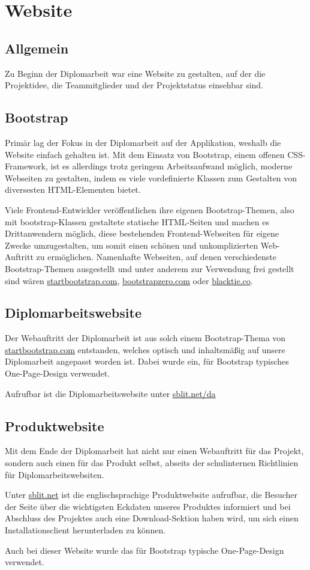 \chapter{Website}
\section{Allgemein}
Zu Beginn der Diplomarbeit war eine Website zu gestalten, auf der die Projektidee,
die Teammitglieder und der Projektstatus einsehbar sind.

\section{Bootstrap}
Primär lag der Fokus in der Diplomarbeit auf der Applikation, weshalb die Website
einfach gehalten ist. Mit dem Einsatz von Bootstrap, einem offenen CSS-Framework,
ist es allerdings trotz geringem Arbeitsaufwand möglich, moderne Webseiten zu gestalten,
indem es viele vordefinierte Klassen zum Gestalten von diversesten HTML-Elementen bietet.

Viele Frontend-Entwickler veröffentlichen ihre eigenen Bootstrap-Themen, also
mit bootstrap-Klassen gestaltete statische HTML-Seiten und machen es Drittanwendern
möglich, diese bestehenden Frontend-Webseiten für eigene Zwecke umzugestalten,
um somit einen schönen und unkomplizierten Web-Auftritt zu ermöglichen. Namenhafte
Webseiten, auf denen verschiedenste Bootstrap-Themen ausgestellt und unter
anderem zur Verwendung frei gestellt sind wären \href{http://startbootstrap.com/}{startbootstrap.com},
\href{http://bootstrapzero.com/}{bootstrapzero.com} oder \href{http://blacktie.co/}{blacktie.co}.

\section{Diplomarbeitswebsite}
Der Webauftritt der Diplomarbeit ist aus solch einem Bootstrap-Thema von
\href{http://startbootstrap.com/}{startbootstrap.com} entstanden, welches optisch und inhaltsmäßig auf unsere
Diplomarbeit angepasst worden ist. Dabei wurde ein, für Bootstrap typisches
One-Page-Design verwendet.

Aufrufbar ist die Diplomarbeitswebsite unter \href{http://sblit.net/da/}{sblit.net/da}

\section{Produktwebsite}
Mit dem Ende der Diplomarbeit hat \sblit nicht nur einen Webauftritt für das Projekt,
sondern auch einen für das Produkt selbst, abseits der schulinternen Richtlinien für Diplomarbeitswebsiten.

Unter \href{http://sblit.net/}{sblit.net} ist die englischsprachige Produktwebsite aufrufbar,
die Besucher der Seite über die wichtigsten Eckdaten unseres Produktes informiert und bei
Abschluss des Projektes auch eine Download-Sektion haben wird, um sich einen Installationsclient herunterladen zu können.

Auch bei dieser Website wurde das für Bootstrap typische One-Page-Design verwendet.

